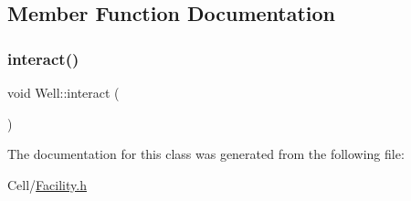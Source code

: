 \subsection{Member Function Documentation}
\mbox{\label{classWell_a0b05bce6404fb86371f31ae7734ca01c}} 
\subsubsection{\texorpdfstring{interact()}{interact()}}
{\footnotesize\ttfamily void Well\+::interact (\begin{DoxyParamCaption}{ }\end{DoxyParamCaption})}



The documentation for this class was generated from the following file\+:\begin{DoxyCompactItemize}
\item 
Cell/\mbox{\hyperlink{Facility_8h}{Facility.\+h}}\end{DoxyCompactItemize}

